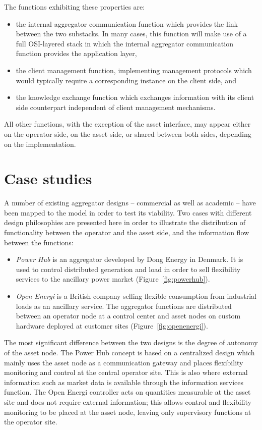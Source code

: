 The functions exhibiting these properties are:
\begin{itemize}
\item the internal aggregator communication function which provides the link between the two substacks. In many cases, this function will make use of a full OSI-layered stack in which the internal aggregator communication function provides the application layer,
\item the client management function, implementing management protocols which would typically require a corresponding instance on the client side, and
\item the knowledge exchange function which exchanges information with its client side counterpart independent of client management mechanisms.
\end{itemize}

All other functions, with the exception of the asset interface, may appear either on the operator side, on the asset side, or shared between both sides, depending on the implementation.

\section{Case studies} 
\label{sec:applic}

A number of existing aggregator designs -- commercial as well as academic -- have been mapped to the model in order to test its viability. Two cases with different design philosophies are presented here in order to illustrate the distribution of functionality between the operator and the asset side, and the information flow between the functions:
\begin{itemize}
	\item \emph{Power Hub} is an aggregator developed by Dong Energy in Denmark. It is used to control distributed generation and load in order to sell flexibility services to the ancillary power market (Figure~\ref{fig:powerhub}).
\item \emph{Open Energi} is a British company selling flexible consumption from industrial loads as an ancillary service. The aggregator functions are distributed between an operator node at a control center and asset nodes on custom hardware deployed at customer sites (Figure~\ref{fig:openenergi}).
\end{itemize}

The most significant difference between the two designs is the degree of autonomy of the asset node. The Power Hub concept is based on a centralized design which mainly uses the asset node as a communication gateway and places flexibility monitoring and control at the central operator site. This is also where external information such as market data is available through the information services function.
The Open Energi controller acts on quantities measurable at the asset site and does not require external information; this allows control and flexibility monitoring to be placed at the asset node, leaving only supervisory functions at the operator site.

